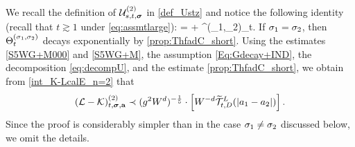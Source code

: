 We recall the definition of $\mathcal U_{s,t,{\boldsymbol{\sigma}}}^{(2)}$ in \eqref{def_Ustz} and notice the following identity (recall that $t\gtrsim1$ under \eqref{eq:assmtlarge}): 
\be\label{eq:decompU} =  + \Theta^{(\sig_1,\sig_2)}_t.\ee
If $\sigma_1=\sigma_2$, then $\Theta_{t}^{(\sigma_1,\sigma_2)}$ decays exponentially by \eqref{prop:ThfadC_short}. Using the estimates \eqref{S5WG+M000} and \eqref{S5WG+M}, the assumption \eqref{Eq:Gdecay+IND}, the decomposition \eqref{eq:decompU}, and the estimate \eqref{prop:ThfadC_short}, we obtain from \eqref{int_K-LcalE_n=2} that 
\[ (\mathcal{L} - \mathcal{K})^{(2)}_{t, {\boldsymbol{\sigma}}, {\mathbf{a}}} \prec (g^2W^{d})^{-\frac15}\cdot \left[{W^{-d}\widetilde{\mathcal T}^{L}_{t,D}(|a_1-a_2|)}\right].\]
Since the proof is considerably simpler than in the case $\sigma_1\ne \sigma_2$  discussed below, we omit the details.
 


